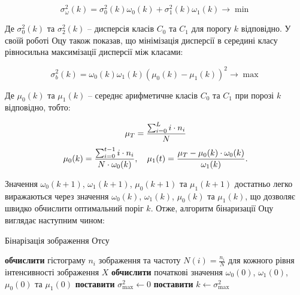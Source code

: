 $$\sigma_{\omega}^{2}(k) = \sigma_{0}^2(k) \omega_0(k) + \sigma_{1}^2(k) \omega_1(k) \rightarrow \min$$

Де $\sigma_{0}^2(k)$ та $\sigma_{2}^2(k)$ -- дисперсія класів $C_0$ та $C_1$ для порогу $k$ відповідно. У своїй роботі Оцу також показав, що мінімізація дисперсії в середині класу рівносильна максимізації дисперсії між класами:

$$\sigma_{b}^2(k) = \omega_0(k)\omega_1(k) \left( \mu_0(k) - \mu_1(k) \right)^2 \rightarrow \max$$

Де $\mu_0(k)$ та $\mu_1(k)$ -- середнє арифметичне класів $C_0$ та $C_1$ при порозі $k$ відповідно, тобто:

$$\mu_T = {{\sum^{L}_{i=0} {i \cdot n_i}} \over {N}} $$
$$\mu_0(k) = {{\sum^{t-1}_{i=0} {i \cdot n_i}} \over {N \cdot \omega_0(k)}}, \quad \mu_1(t) = {{\mu_T - \mu_0(k) \cdot \omega_0(k)} \over {\omega_1(k)}}.$$

Значення $\omega_0(k+1)$, $\omega_1(k+1)$, $\mu_0(k+1)$ та $\mu_1(k+1)$ достатньо легко виражаються через значення $\omega_0(k)$, $\omega_1(k)$, $\mu_0(k)$ та $\mu_1(k)$, що дозволяє швидко обчислити оптимальний поріг $k$. Отже, алгоритм бінаризації Оцу виглядає наступним чином:

\begin{megaalgorithm}[H]
	\caption{Бінарізація зображення Отсу}
	
	\BlankLine 
	
	\textbf{обчислити} гістограму $n_i$ зображення та частоту $N(i) = \frac{n_i}{N}$ для кожного рівня інтенсивності зображення $X$\;
	\textbf{обчислити} початкові значення $\omega_0(0)$, $\omega_1(0)$, $\mu_0(0)$ та $\mu_1(0)$\;
	\textbf{поставити} $\sigma_{\max}^2 \leftarrow 0$\;
	\textbf{поставити} $k \leftarrow \sigma_{\max}^2$\;
\end{megaalgorithm}

